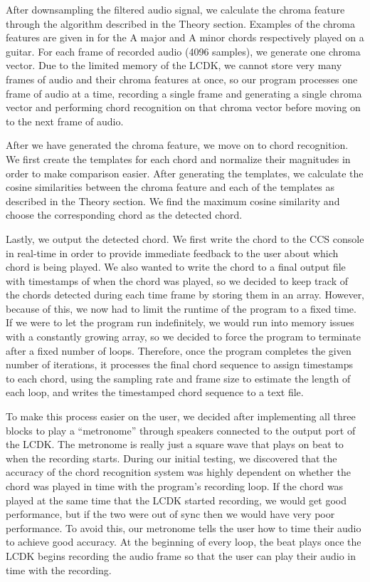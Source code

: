 \documentclass[journal]{IEEEtran}
\begin{document}
After downsampling the filtered audio signal, we calculate the chroma feature through the algorithm described in the Theory section.
Examples of the chroma features are given in  for the A major and A minor chords respectively played on a guitar.
For each frame of recorded audio (4096 samples), we generate one chroma vector.
Due to the limited memory of the LCDK, we cannot store very many frames of audio and their chroma features at once, so our program processes one frame of audio at a time, recording a single frame and generating a single chroma vector and performing chord recognition on that chroma vector before moving on to the next frame of audio.

After we have generated the chroma feature, we move on to chord recognition.
We first create the templates for each chord and normalize their magnitudes in order to make comparison easier.
After generating the templates, we calculate the cosine similarities between the chroma feature and each of the templates as described in the Theory section.
We find the maximum cosine similarity and choose the corresponding chord as the detected chord.

Lastly, we output the detected chord.
We first write the chord to the CCS console in real-time in order to provide immediate feedback to the user about which chord is being played.
We also wanted to write the chord to a final output file with timestamps of when the chord was played, so we decided to keep track of the chords detected during each time frame by storing them in an array.
However, because of this, we now had to limit the runtime of the program to a fixed time.
If we were to let the program run indefinitely, we would run into memory issues with a constantly growing array, so we decided to force the program to terminate after a fixed number of loops.
Therefore, once the program completes the given number of iterations, it processes the final chord sequence to assign timestamps to each chord, using the sampling rate and frame size to estimate the length of each loop, and writes the timestamped chord sequence to a text file.

To make this process easier on the user, we decided after implementing all three blocks to play a ``metronome'' through speakers connected to the output port of the LCDK.
The metronome is really just a square wave that plays on beat to when the recording starts.
During our initial testing, we discovered that the accuracy of the chord recognition system was highly dependent on whether the chord was played in time with the program's recording loop.
If the chord was played at the same time that the LCDK started recording, we would get good performance, but if the two were out of sync then we would have very poor performance.
To avoid this, our metronome tells the user how to time their audio to achieve good accuracy.
At the beginning of every loop, the beat plays once the LCDK begins recording the audio frame so that the user can play their audio in time with the recording.
\end{document}
